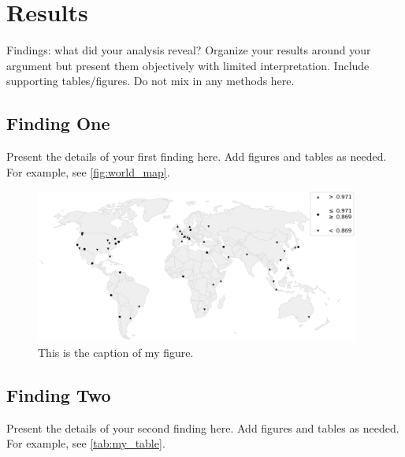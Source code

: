 \documentclass[12pt,letterpaper]{article} %
\begin{document}
\section{Results}

Findings: what did your analysis reveal? Organize your results around your argument but present them objectively with limited interpretation. Include supporting tables/figures. Do not mix in any methods here.

\subsection{Finding One}

Present the details of your first finding here. Add figures and tables as needed. For example, see \autoref{fig:world_map}.

\begin{figure}[tbhp]
    \centering
    \includegraphics[width=0.95\textwidth]{fig_example.png}
    \caption{This is the caption of my figure.}\label{fig:world_map}
\end{figure}

\subsection{Finding Two}

Present the details of your second finding here. Add figures and tables as needed. For example, see \autoref{tab:my_table}.

\begin{table}[tbhp]
    \centering
    \caption{This is the caption of my table.}\label{tab:my_table}
\end{table}
\end{document}
